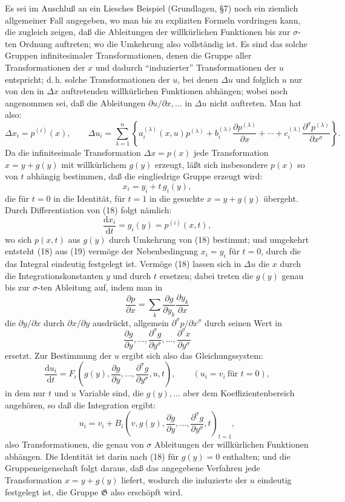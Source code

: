 \documentclass[11pt]{article}
\newcommand{\dd}{\mathrm d}
\newcommand{\G}{\mathfrak G}
\newcommand{\D}{\Delta}
\newcommand{\p}{\partial}
\begin{document}
Es sei im Anschluß an ein Liesches Beispiel (Grundlagen, \S{}7) noch ein ziemlich allgemeiner Fall angegeben, wo man bis zu expliziten Formeln vordringen kann, die zugleich zeigen, daß die Ableitungen der willkürlichen Funktionen bis zur \(\sigma\)-ten Ordnung auftreten; wo die Umkehrung also vollständig ist. Es sind das solche Gruppen infinitesimaler Transformationen, denen die Gruppe aller Transformationen der \(x\) und dadurch ``induzierter'' Transformationen der \(u\) entspricht; d.\,h. solche Transformationen der \(u\), bei denen \(\D u\) und folglich \(u\) nur von den in \(\D x\) auftretenden willkürlichen Funktionen abhängen; wobei noch angenommen sei, daß die Ableitungen \(\p u/\p x,\ldots\) in \(\D u\) nicht auftreten. Man hat also:
\[
\D x_i=p^{(i)}(x),\qquad
\D u_i=
\sum_{\lambda=1}^{n}\left\{
a_i^{(\lambda)}(x,u)p^{(\lambda)}
+b_i^{(\lambda)}\frac{\p p^{(\lambda)}}{\p x}
+\cdots+
c_i^{(\lambda)}\frac{\p^\sigma p^{(\lambda)}}{\p x^\sigma}
\right\}.
\]
Da die infinitesimale Transformation \(\D x=p(x)\) jede Transformation \(x=y+g(y)\) mit willkürlichem \(g(y)\) erzeugt, läßt sich insbesondere \(p(x)\) so von \(t\) abhängig bestimmen, daß die eingliedrige Gruppe erzeugt wird:
\begin{equation}
x_i=y_i+t\,g_i(y),
\tag{18}
\end{equation}
die für \(t=0\) in die Identität, für \(t=1\) in die gesuchte \(x=y+g(y)\) übergeht. Durch Differentiation von (18) folgt nämlich:
\begin{equation}
\frac{\dd x_i}{\dd t}=g_i(y)=p^{(i)}(x,t),
\tag{19}
\end{equation}
wo sich \(p(x,t)\) aus \(g(y)\) durch Umkehrung von (18) bestimmt; und umgekehrt entsteht (18) aus (19) vermöge der Nebenbedingung \(x_i=y_i\) für \(t=0\), durch die das Integral eindeutig festgelegt ist. Vermöge (18) lassen sich in \(\D u\) die \(x\) durch die Integrationskonstanten \(y\) und durch \(t\) ersetzen; dabei treten die \(g(y)\) genau bis zur \(\sigma\)-ten Ableitung auf, indem man in
\[
\frac{\p p}{\p x}=\sum_k\frac{\p g}{\p y_k}\frac{\p y_k}{\p x}
\]
die \(\p y/\p x\) durch \(\p x/\p y\) ausdrückt, allgemein \(\p^\sigma p/\p x^\sigma\) durch seinen Wert in
\[
\frac{\p g}{\p y},\ldots,\frac{\p^\sigma g}{\p y^\sigma},\ldots,\frac{\p^\sigma x}{\p y^\sigma}
\]
ersetzt. Zur Bestimmung der \(u\) ergibt sich also das Gleichungssystem:
\[
\frac{\dd u_i}{\dd t}
=
F_i\!\left(g(y),\frac{\p g}{\p y},\ldots,\frac{\p^\sigma g}{\p y^\sigma},u,t\right),
\qquad (u_i=v_i\ \text{für }t=0),
\]
in dem nur \(t\) und \(u\) Variable sind, die \(g(y),\ldots\) aber dem Koeffizientenbereich angehören, so daß die Integration ergibt:
\[
u_i=v_i+
B_i\!\left(v,g(y),\frac{\p g}{\p y},\ldots,\frac{\p^\sigma g}{\p y^\sigma},t\right)_{t=1},
\]
also Transformationen, die genau von \(\sigma\) Ableitungen der willkürlichen Funktionen abhängen. Die Identität ist darin nach (18) für \(g(y)=0\) enthalten; und die Gruppeneigenschaft folgt daraus, daß das angegebene Verfahren jede Transformation \(x=y+g(y)\) liefert, wodurch die induzierte der \(u\) eindeutig festgelegt ist, die Gruppe \(\G\) also erschöpft wird.
\end{document}
